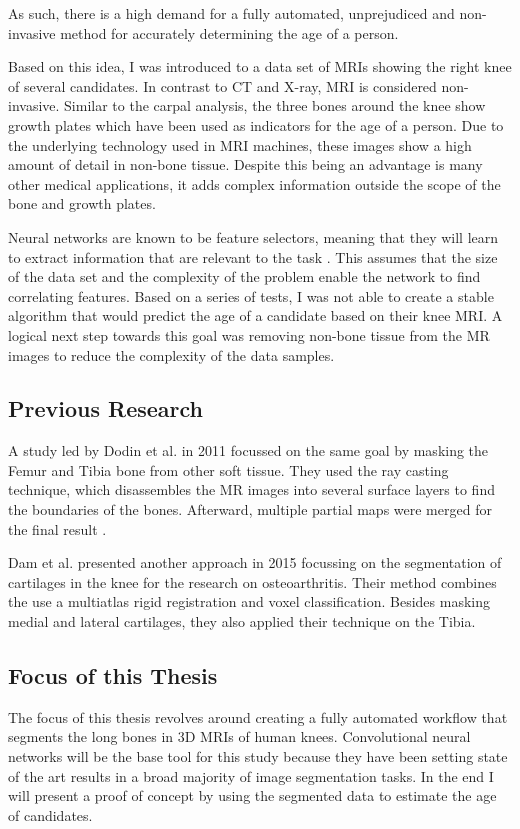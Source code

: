 As such, there is a high demand for a fully automated, unprejudiced and non-invasive method for accurately determining the age of a person.

Based on this idea, I was introduced to a data set of MRIs showing the right knee of several candidates. In contrast to CT and X-ray, MRI is considered non-invasive. Similar to the carpal analysis, the three bones around the knee show growth plates which have been used as indicators for the age of a person. Due to the underlying technology used in MRI machines, these images show a high amount of detail in non-bone tissue. Despite this being an advantage is many other medical applications, it adds complex information outside the scope of the bone and growth plates.

Neural networks are known to be feature selectors, meaning that they will learn to extract information that are relevant to the task \cite{Setiono1997}. This assumes that the size of the data set and the complexity of the problem enable the network to find correlating features. Based on a series of tests, I was not able to create a stable algorithm that would predict the age of a candidate based on their knee MRI. A logical next step towards this goal was removing non-bone tissue from the MR images to reduce the complexity of the data samples.

\subsection{Previous Research}

A study led by Dodin et al. in 2011 focussed on the same goal by masking the Femur and Tibia bone from other soft tissue. They used the ray casting technique, which disassembles the MR images into several surface layers to find the boundaries of the bones. Afterward, multiple partial maps were merged for the final result \cite{Dodin2011}.

Dam et al. presented another approach in 2015 focussing on the segmentation of cartilages in the knee for the research on osteoarthritis. Their method combines the use a multiatlas rigid registration and voxel classification. Besides masking medial and lateral cartilages, they also applied their technique on the Tibia.

\subsection{Focus of this Thesis}

The focus of this thesis revolves around creating a fully automated workflow that segments the long bones in 3D MRIs of human knees. Convolutional neural networks will be the base tool for this study because they have been setting state of the art results in a broad majority of image segmentation tasks. In the end I will present a proof of concept by using the segmented data to estimate the age of candidates.

\newpage
